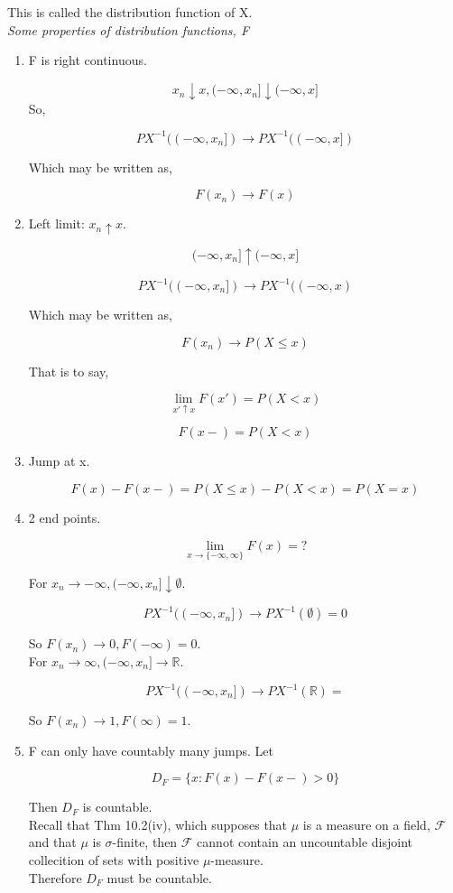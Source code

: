 \documentclass[11pt,fleqn]{book} %
\begin{document}
This is called the distribution function of X. \\


\textit{Some properties of distribution functions, F}\\


	\begin{enumerate}
		\item F is right continuous. 

				$$x_n \downarrow x, (-\infty, x_n] \downarrow (-\infty, x]$$
		So, 

				$$PX^{-1}((-\infty, x_n]) \rightarrow PX^{-1}((-\infty, x]) $$

		Which may be written as, 

				$$F(x_n) \rightarrow F(x) $$

		\item Left limit: $x_n \uparrow x$.

				$$ (-\infty, x_n] \uparrow (-\infty, x]$$ 


				$$PX^{-1}((-\infty, x_n]) \rightarrow PX^{-1}((-\infty, x) $$

		Which may be written as, 

				$$F(x_n) \rightarrow P(X \leq x) $$

		That is to say, 

				$$\lim_{x' \uparrow x} F(x') = P(X < x) $$

				$$F(x-) = P(X < x) $$
		
		\item Jump at x. 

				 $$F(x) - F(x-) = P(X\leq x) - P(X < x) = P(X = x) $$

		\item 2 end points.

				$$\lim_{x \rightarrow \{-\infty, \infty\}} F(x) = \text{?}$$

		For $x_n \rightarrow - \infty, (-\infty, x_n] \downarrow \emptyset$. 

				$$P X^{-1}((-\infty, x_n]) \rightarrow  P X^{-1}(\emptyset) = 0$$

		So $F(x_n) \rightarrow 0, F(-\infty) = 0$. \\


		For $x_n \rightarrow  \infty, (-\infty, x_n] \rightarrow \mathbb{R}$. 

				$$P X^{-1}((-\infty, x_n]) \rightarrow  P X^{-1}(\mathbb{R}) = $$

		So $F(x_n) \rightarrow 1, F(\infty) = 1$. \\
		
		\item F can only have countably many jumps. Let

				$$D_F = \{x: F(x) - F(x-) > 0\} $$

		Then $D_F$ is countable. \\
	
	Recall that Thm 10.2(iv), which supposes that $\mu$ is a measure on a field, $\mathcal{F}$ and that $\mu$ is $\sigma$-finite, then $\mathcal{F}$ cannot contain an uncountable disjoint collecition of sets with positive $\mu$-measure. \\

	Therefore $D_F$ must be countable. 
	\end{enumerate}
\end{document}
